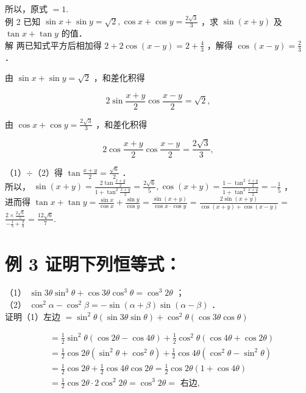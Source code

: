 \documentclass[10pt]{article}
\begin{document}
所以，原式 \(=1\).\\
例 2 已知 \(\sin x+\sin y=\sqrt{2}, \cos x+\cos y=\frac{2 \sqrt{3}}{3}\) ，求 \(\sin (x+y)\) 及 \(\tan x+\tan y\) 的值．\\
解 两已知式平方后相加得 \(2+2 \cos (x-y)=2+\frac{4}{3}\) ，解得 \(\cos (x-y)=\frac{2}{3}\) ．

由 \(\sin x+\sin y=\sqrt{2}\) ，和差化积得

\[
2 \sin \frac{x+y}{2} \cos \frac{x-y}{2}=\sqrt{2},
\]

由 \(\cos x+\cos y=\frac{2 \sqrt{3}}{3}\) ，和差化积得

\[
2 \cos \frac{x+y}{2} \cos \frac{x-y}{2}=\frac{2 \sqrt{3}}{3},
\]

（1）\(\div\)（2）得 \(\tan \frac{x+y}{2}=\frac{\sqrt{6}}{2}\) ．\\
所以， \(\sin (x+y)=\frac{2 \tan \frac{x+y}{2}}{1+\tan ^{2} \frac{x+y}{2}}=\frac{2 \sqrt{6}}{5}, \cos (x+y)=\frac{1-\tan ^{2} \frac{x+y}{2}}{1+\tan ^{2} \frac{x+y}{2}}=-\frac{1}{5}\) ，\\
进而得 \(\tan x+\tan y=\frac{\sin x}{\cos x}+\frac{\sin y}{\cos y}=\frac{\sin (x+y)}{\cos x \cdot \cos y}=\frac{2 \sin (x+y)}{\cos (x+y)+\cos (x-y)}=\) \(\frac{2 \times \frac{2 \sqrt{6}}{5}}{-\frac{1}{5}+\frac{2}{3}}=\frac{12 \sqrt{6}}{7}\).

\section*{例 3 证明下列恒等式：}
（1） \(\sin 3 \theta \sin ^{3} \theta+\cos 3 \theta \cos ^{3} \theta=\cos ^{3} 2 \theta\) ；\\
（2） \(\cos ^{2} \alpha-\cos ^{2} \beta=-\sin (\alpha+\beta) \sin (\alpha-\beta)\) ．\\
证明（1）左边 \(=\sin ^{2} \theta(\sin 3 \theta \sin \theta)+\cos ^{2} \theta(\cos 3 \theta \cos \theta)\)

\[
\begin{aligned}
& =\frac{1}{2} \sin ^{2} \theta(\cos 2 \theta-\cos 4 \theta)+\frac{1}{2} \cos ^{2} \theta(\cos 4 \theta+\cos 2 \theta) \\
& =\frac{1}{2} \cos 2 \theta\left(\sin ^{2} \theta+\cos ^{2} \theta\right)+\frac{1}{2} \cos 4 \theta\left(\cos ^{2} \theta-\sin ^{2} \theta\right) \\
& =\frac{1}{2} \cos 2 \theta+\frac{1}{2} \cos 4 \theta \cos 2 \theta=\frac{1}{2} \cos 2 \theta(1+\cos 4 \theta) \\
& =\frac{1}{2} \cos 2 \theta \cdot 2 \cos ^{2} 2 \theta=\cos ^{3} 2 \theta=\text { 右边, }
\end{aligned}
\]
\end{document}
